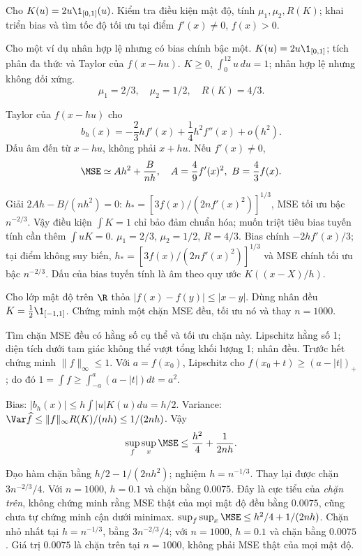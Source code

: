 \begin{problem}\label{k:45}
Cho $K(u)=2u\1_{[0,1]}(u)$. Kiểm tra điều kiện mật độ, tính $\mu_1,\mu_2,R(K)$; khai triển bias và tìm tốc độ tối ưu tại điểm $f'(x)\ne0$, $f(x)>0$.
\end{problem}
\begin{solution}
Cho một ví dụ nhân hợp lệ nhưng có bias chính bậc một.
$K(u)=2u\1_{[0,1]}$; tích phân đa thức và Taylor của $f(x-hu)$.
$K\ge0$, $\int_0^12u\,du=1$; nhân hợp lệ nhưng không đối xứng.
\[
 \mu_1=2/3,\quad\mu_2=1/2,\quad R(K)=4/3.
\]

Taylor của $f(x-hu)$ cho
\[
 b_h(x)=-\frac23hf'(x)+\frac14h^2f''(x)+o(h^2).
\]
Dấu âm đến từ $x-hu$, không phải $x+hu$. Nếu $f'(x)\ne0$,
\[
 \MSE\simeq Ah^2+\frac B{nh},\quad A=\frac49f'(x)^2,\ B=\frac43f(x).
\]

Giải $2Ah-B/(nh^2)=0$:
$h_*=[3f(x)/(2nf'(x)^2)]^{1/3}$, MSE tối ưu bậc $n^{-2/3}$.
Vậy điều kiện $\int K=1$ chỉ bảo đảm chuẩn hóa; muốn triệt tiêu bias tuyến tính cần thêm $\int uK=0$.
$\mu_1=2/3$, $\mu_2=1/2$, $R=4/3$. Bias chính $-2hf'(x)/3$; tại điểm không suy biến, $h_*=[3f(x)/(2nf'(x)^2)]^{1/3}$ và MSE chính tối ưu bậc $n^{-2/3}$.
Dấu của bias tuyến tính là âm theo quy ước $K((x-X)/h)$.
\end{solution}

\begin{problem}\label{k:46}
Cho lớp mật độ trên $\R$ thỏa $|f(x)-f(y)|\le|x-y|$. Dùng nhân đều $K=\frac12\1_{[-1,1]}$. Chứng minh một chặn MSE đều, tối ưu nó và thay $n=1000$.
\end{problem}
\begin{solution}
Tìm chặn MSE đều có hằng số cụ thể và tối ưu chặn này.
Lipschitz hằng số 1; diện tích dưới tam giác không thể vượt tổng khối lượng 1; nhân đều.
Trước hết chứng minh $\|f\|_\infty\le1$. Với $a=f(x_0)$, Lipschitz cho $f(x_0+t)\ge(a-|t|)_+$; do đó $1=\int f\ge\int_{-a}^a(a-|t|)dt=a^2$.

Bias:
$|b_h(x)|\le h\int|u|K(u)du=h/2$.
Variance: $\Var\widehat f\le\|f\|_\infty R(K)/(nh)\le1/(2nh)$.
Vậy
\[
 \sup_f\sup_x\MSE\le\frac{h^2}{4}+\frac1{2nh}.
\]

Đạo hàm chặn bằng $h/2-1/(2nh^2)$; nghiệm $h=n^{-1/3}$. Thay lại được chặn $3n^{-2/3}/4$. Với $n=1000$, $h=0.1$ và chặn bằng $0.0075$.
Đây là cực tiểu của \emph{chặn trên}, không chứng minh rằng MSE thật của mọi mật độ đều bằng $0.0075$, cũng chưa tự chứng minh cận dưới minimax.
$\sup_f\sup_x\MSE\le h^2/4+1/(2nh)$. Chặn nhỏ nhất tại $h=n^{-1/3}$, bằng $3n^{-2/3}/4$; với $n=1000$, $h=0.1$ và chặn bằng $0.0075$.
Giá trị $0.0075$ là chặn trên tại $n=1000$, không phải MSE thật của mọi mật độ.
\end{solution}

